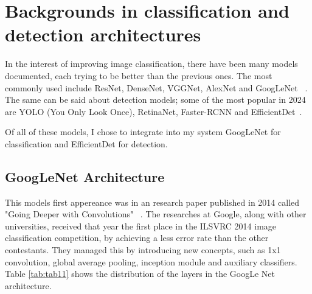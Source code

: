 \chapter{Backgrounds in classification and detection architectures}
\label{chap:ch3}

In the interest of improving image classification, there have been many models documented, each trying to be better than the previous ones. The most commonly used include ResNet, DenseNet, VGGNet, AlexNet and GoogLeNet ~\cite{link8}. The same can be said about detection models; some of the most popular in 2024 are YOLO (You Only Look Once), RetinaNet, Faster-RCNN and EfficientDet~\cite{carte11}.

Of all of these models, I chose to integrate into my system GoogLeNet for classification and EfficientDet for detection.

\section{GoogLeNet Architecture}

This models first appereance was in an research paper published in 2014 called "Going Deeper with Convolutions" ~\cite{carte13}. The researches at Google, along with other universities, received that year the first place in the  ILSVRC 2014 image classification competition, by achieving a less error rate than the other contestants. They managed this by introducing new concepts, such as 1x1 convolution, global average pooling, inception module and auxiliary classifiers. Table \ref{tab:tab11} shows the distribution of the layers in the GoogLe Net architecture.

